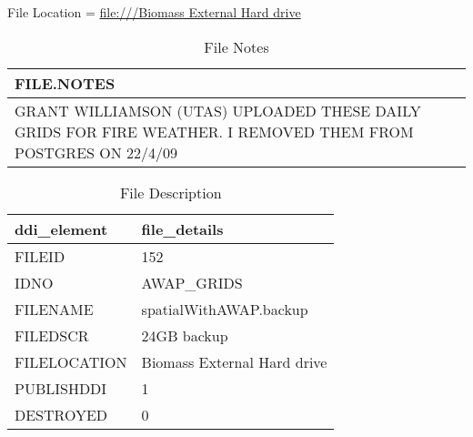 \documentclass[a4paper]{article}
\begin{document}
\noindent File Location = \url{file:///Biomass External Hard drive}




 

\begin{table}[ht]
\begin{center}
\caption{File Notes}
\label{tab:tabx}
\begin{tabular}{p{10cm}}
  \hline
FILE.NOTES \\ 
  \hline
GRANT WILLIAMSON (UTAS) UPLOADED THESE DAILY GRIDS FOR FIRE WEATHER.  I REMOVED THEM FROM POSTGRES ON 22/4/09 \\ 
   \hline
\end{tabular}
\end{center}
\end{table}
\begin{table}[ht]
\begin{center}
\caption{File Description}
\label{tab:tabx}
\begin{tabular}{p{4cm}p{9cm}}
  \hline
ddi\_element & file\_details \\ 
  \hline
FILEID & 152 \\ 
  IDNO & AWAP\_GRIDS \\ 
  FILENAME & spatialWithAWAP.backup \\ 
  FILEDSCR & 24GB backup \\ 
  FILELOCATION & Biomass External Hard drive \\ 
  PUBLISHDDI & 1 \\ 
  DESTROYED & 0 \\ 
   \hline
\end{tabular}
\end{center}
\end{table}\clearpage\clearpage
\end{document}
